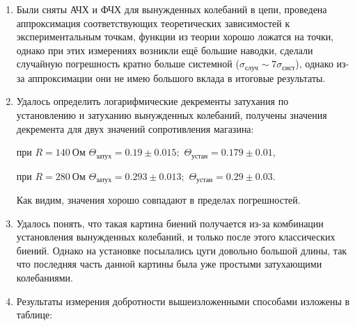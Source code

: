 \documentclass[a4paper,12pt]{extarticle}
\begin{document}
\begin{enumerate}
    \item Были сняты АЧХ и ФЧХ для вынужденных колебаний в цепи, проведена аппроксимация соответствующих теоретических зависимостей к экспериментальным точкам, функции из теории хорошо ложатся на точки, однако при этих измерениях возникли ещё большие наводки, сделали случайную погрешность кратно больше системной ($\sigma_\text{случ} \sim 7 \sigma_\text{сист}$), однако из-за аппроксимации они не имею большого вклада в итоговые результаты.

    \item Удалось определить логарифмические декременты затухания по установлению и затуханию вынужденных колебаний, получены значения декремента для двух значений сопротивления магазина:

    при $R = 140 \ \text{Ом}$ $\Theta_\text{затух} = 0.19 \pm 0.015;$ $\Theta_\text{устан} = 0.179 \pm 0.01$,

    при $R = 280 \ \text{Ом}$ $\Theta_\text{затух} = 0.293 \pm 0.013;$ $\Theta_\text{устан} = 0.29 \pm 0.03$.

    Как видим, значения хорошо совпадают в пределах погрешностей.

    \item Удалось понять, что такая картина биений получается из-за комбинации установления вынужденных колебаний, и только после этого классических биений. Однако на установке посылались цуги довольно большой длины, так что последняя часть данной картины была уже простыми затухающими колебаниями.

    \item Результаты измерения добротности вышеизложенными способами изложены в таблице:


\end{enumerate}
\end{document}
